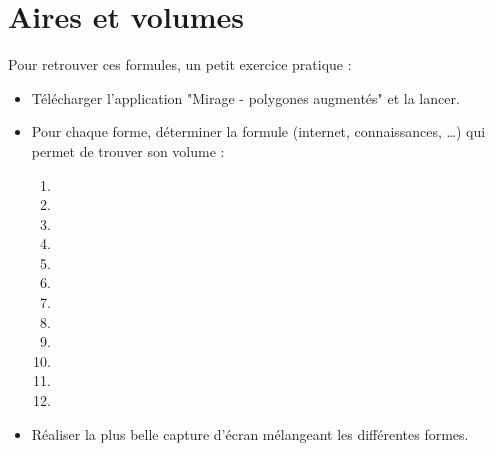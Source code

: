 \chapter{Aires et volumes}

Pour retrouver ces formules, un petit exercice pratique :

\begin{itemize}
\item Télécharger l'application "Mirage - polygones augmentés" et la lancer.
\item Pour chaque forme, déterminer la formule (internet, connaissances, \dots) qui permet de trouver son volume : 
	\begin{enumerate}
	\item 
	\item \vspace*{8mm}
	\item \vspace*{8mm}
	\item \vspace*{8mm}
	\item \vspace*{8mm}
	\item \vspace*{8mm}
	\item \vspace*{8mm}
	\item \vspace*{8mm}
	\item \vspace*{8mm}
	\item \vspace*{8mm}
	\item \vspace*{8mm}
	\item \vspace*{8mm}
	\end{enumerate}
	\vspace*{8mm}
\item Réaliser la plus belle capture d'écran mélangeant les différentes formes.
\end{itemize}



